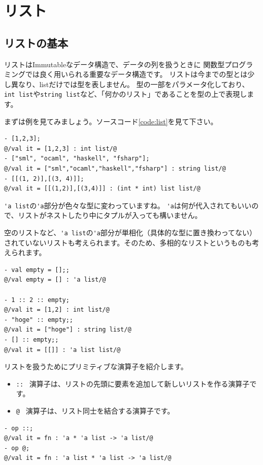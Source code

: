 \documentclass[11pt,a4paper]{article}
\begin{document}
\section{リスト}
\subsection{リストの基本}
リストはImmutableなデータ構造で、データの列を扱うときに
関数型プログラミングでは良く用いられる重要なデータ構造です。
リストは今までの型とは少し異なり、listだけでは型を表しません。
型の一部をパラメータ化しており、
\lstinline{int list}や\lstinline{string list}など、「何かのリスト」であることを型の上で表現します。

まずは例を見てみましょう。ソースコード\ref{code:list}を見て下さい。

\begin{lstlisting}[caption=色々なリスト,label=code:list]
- [1,2,3];
@/val it = [1,2,3] : int list/@
- ["sml", "ocaml", "haskell", "fsharp"];
@/val it = ["sml","ocaml","haskell","fsharp"] : string list/@
- [[(1, 2)],[(3, 4)]];
@/val it = [[(1,2)],[(3,4)]] : (int * int) list list/@
\end{lstlisting}

\lstinline{'a list}の\lstinline{'a}部分が色々な型に変わっていますね。
\lstinline{'a}は何が代入されてもいいので、リストがネストしたり中にタプルが入っても構いません。

空のリストなど、\lstinline{'a list}の\lstinline{'a}部分が単相化（具体的な型に置き換わってない）
されていないリストも考えられます。そのため、多相的なリストというものも考えられます。

\begin{lstlisting}[caption=多相的なリスト,label=code:poly-list]
- val empty = [];;
@/val empty = [] : 'a list/@

- 1 :: 2 :: empty;
@/val it = [1,2] : int list/@
- "hoge" :: empty;;
@/val it = ["hoge"] : string list/@
- [] :: empty;;
@/val it = [[]] : 'a list list/@
\end{lstlisting}

リストを扱うためにプリミティブな演算子を紹介します。
\begin{itemize}
\item \lstinline{::} \ 演算子は、リストの先頭に要素を追加して新しいリストを作る演算子です。
\item \lstinline{@} \ 演算子は、リスト同士を結合する演算子です。
\end{itemize}

\begin{lstlisting}[caption=リスト操作演算子の型,label=code:list-operators]
- op ::;
@/val it = fn : 'a * 'a list -> 'a list/@
- op @;
@/val it = fn : 'a list * 'a list -> 'a list/@
\end{lstlisting}
\end{document}
